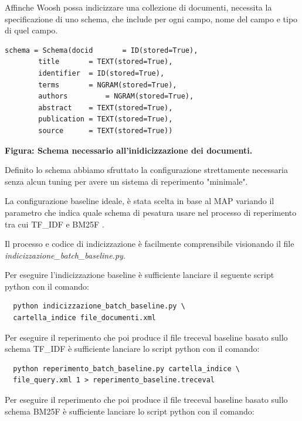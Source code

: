 \documentclass[runningheads]{llncs}
\begin{document}
Affinche Woosh possa indicizzare una collezione di documenti, necessita la
specificazione di uno schema, che include per ogni campo, nome del campo
e tipo di quel campo. \par

\begin{lstlisting}
schema = Schema(docid      	= ID(stored=True),
		title      	= TEXT(stored=True),
		identifier	= ID(stored=True),
		terms 		= NGRAM(stored=True),
		authors      	= NGRAM(stored=True),
		abstract 	= TEXT(stored=True),
		publication	= TEXT(stored=True),
		source 		= TEXT(stored=True))
\end{lstlisting}
\begin{tablenotes}
      \small
      \item \bf Figura: Schema necessario all'inidicizzazione dei documenti. 
    \end{tablenotes}


Definito lo schema abbiamo sfruttato la configurazione strettamente necessaria senza alcun tuning per avere 
un sistema di reperimento "minimale". 

La configurazione baseline ideale, \`e stata scelta in base al MAP variando il parametro che indica quale schema di 
pesatura usare nel processo di reperimento tra cui TF\_IDF e BM25F .

 Il processo e codice di indicizzazione \`e  facilmente comprensibile visionando il file  \emph{indicizzazione\_batch\_baseline.py}. \par
\lstset{
  language=bash,
  basicstyle=\ttfamily
}

Per eseguire l'indicizzazione  baseline \`e sufficiente lanciare il seguente script python con il comando:
\begin{lstlisting}
  python indicizzazione_batch_baseline.py \ 
  cartella_indice file_documenti.xml
\end{lstlisting}

Per eseguire il reperimento che poi produce il file treceval baseline basato sullo schema TF\_IDF \`e sufficiente lanciare 
lo script python con il comando:

\begin{lstlisting}
  python reperimento_batch_baseline.py cartella_indice \
  file_query.xml 1 > reperimento_baseline.treceval
\end{lstlisting}

Per eseguire il reperimento che poi produce il file treceval baseline basato sullo schema BM25F \`e sufficiente lanciare 
lo script python con il comando:
\end{document}
